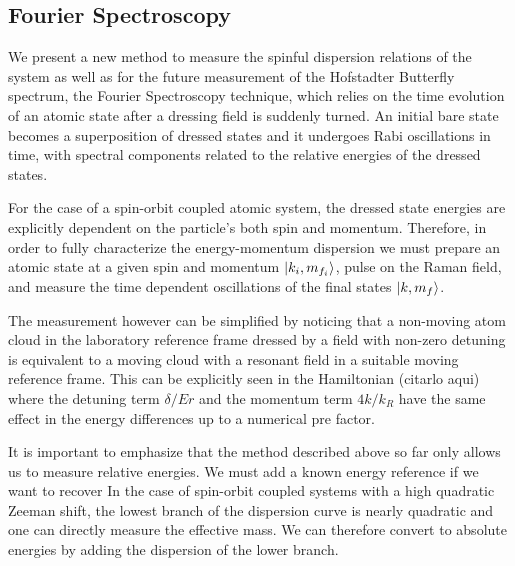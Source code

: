 %











\subsection{Fourier Spectroscopy}		

We present a new method to measure the spinful dispersion relations of the system as well as for the future measurement of the Hofstadter Butterfly spectrum, the Fourier Spectroscopy technique, which relies on the time evolution of an atomic state after a dressing field is suddenly turned. An initial bare state becomes a superposition of dressed states and it undergoes Rabi oscillations in time, with spectral components related to the relative energies of the dressed states. 


For the case of a spin-orbit coupled atomic system, the dressed state energies are explicitly dependent on the particle's both spin and momentum. Therefore, in order to fully characterize the energy-momentum dispersion we must prepare an atomic state at a given spin and momentum $|k_i,m_{f_i}\rangle$, pulse on the Raman field, and measure the time dependent oscillations of the final states $|k,m_f\rangle$. %

The measurement however can be simplified by noticing that a non-moving atom cloud in the laboratory reference frame dressed by a field with non-zero detuning is equivalent to a moving cloud with a resonant field in a suitable moving reference frame. This can be explicitly seen in the Hamiltonian (citarlo aqui) where the detuning term $\delta/Er$  and the momentum term $4 k/k_R$ have the same effect in the energy differences up to a numerical pre factor.

It is important to emphasize that the method described above so far only allows us to measure relative energies. We must add a known energy reference if we want to recover In the case of spin-orbit coupled systems with a high quadratic Zeeman shift, the lowest branch of the dispersion curve is nearly quadratic and one can directly measure the effective mass.  We can therefore convert to absolute energies by adding the dispersion of the lower branch.



